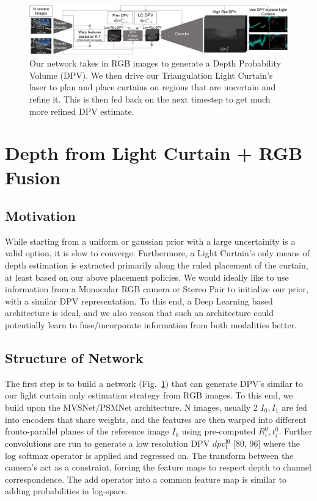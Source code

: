 \begin{figure}[t!]
   \includegraphics[width=1.0\textwidth]{figures/network.pdf}
   \caption{Our network takes in RGB images to generate a Depth Probability Volume (DPV). We then drive our Triangulation Light Curtain's laser to plan and place curtains on regions that are uncertain and refine it. This is then fed back on the next timestep to get much more refined DPV estimate.}
   \label{fig:network}
\end{figure}
   
\section{Depth from Light Curtain + RGB Fusion}

\subsection{Motivation}

While starting from a uniform or gaussian prior with a large uncertainity is a valid option, it is slow to converge. Furthermore, a Light Curtain's only means of depth estimation is extracted primarily along the ruled placement of the curtain, at least based on our above placement policies. We would ideally like to use information from a Monocular RGB camera or Stereo Pair to initialize our prior, with a similar DPV representation. To this end, a Deep Learning based architecture is ideal, and we also reason that such an architecture could potentially learn to fuse/incorporate information from both modalities better.

\subsection{Structure of Network}

The first step is to build a network (Fig.~\ref{fig:network}) that can generate DPV's similar to our light curtain only estimation strategy from RGB images. To this end, we build upon the MVSNet/PSMNet \cite{chang2018pyramid} \cite{yao2018mvsnet} architecture. N images, usually 2 $I_{0}, I_{1}$ are fed into encoders that share weights, and the features are then warped into different fronto-parallel planes of the reference image $I_{0}$ using pre-computed $R_{i}^{0}, t_{i}^{0}$. Further convolutions are run to generate a low resolution DPV $dpv_{\mathrm{t}}^{\mathrm{l0}}$ [80, 96] where the log softmax operator is applied and regressed on. The transform between the camera's act as a constraint, forcing the feature maps to respect depth to channel correspondence. The add operator into a common feature map is similar to adding probabilities in log-space. 

